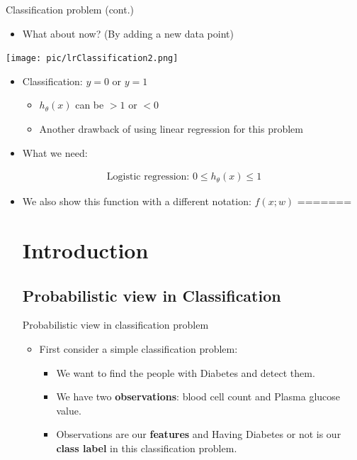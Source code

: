 \documentclass[serif, aspectratio=169]{beamer}
\begin{document}
\begin{frame}{Classification problem (cont.)}
    \begin{itemize}
        \item What about now? (By adding a new data point)
    \end{itemize}
    
    \centering
    \texttt{[image: pic/lrClassification2.png]}
    
    \begin{itemize}
        \item Classification: $y=0$ or $y=1$
            \begin{itemize}
                \item $h_ \theta(x)$ can be $>1$ or $<0$
                \item Another drawback of using linear regression for this problem
            \end{itemize}
        \item What we need:
    \end{itemize}
    \begin{align*}
        \text{Logistic regression:  } 0 \leq h_\theta (x) \leq 1
    \end{align*}
    \begin{itemize}
<<<<<<< HEAD
        \item We also show this function with a different notation: $f(x;w)$
=======
\section{Introduction}
\subsection{Probabilistic view in Classification}

\begin{frame}{Probabilistic view in classification problem}
    \begin{itemize}
        \item First consider a simple classification problem:
            \begin{itemize}
                \item We want to find the people with Diabetes and detect them.
                \item We have two \textbf{observations}: blood cell count and Plasma glucose value.
                \item Observations are our \textbf{features} and Having Diabetes or not is our \textbf{class label} in this classification problem.
            \end{itemize}
    \end{itemize}
    

\end{frame}
\end{itemize}
\end{frame}
\end{document}
